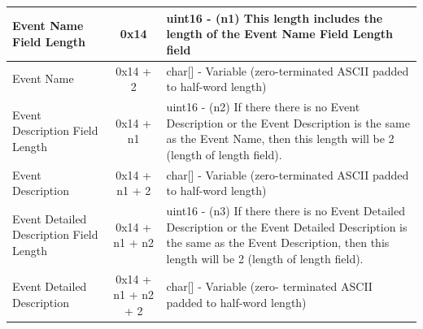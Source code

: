 \documentclass[14]{article}
\begin{document}
\begin{tabular}[l]{|p{5cm}|c|p{7cm}|}
  \hline
  Event Name Field Length & 0x14 & uint16 - (n1) This length includes the length
                                   of the Event Name Field Length field \\
  \hline
  Event Name & 0x14 + 2 & char[] - Variable (zero-terminated ASCII padded to
                          half-word length) \\
  \hline
  Event Description Field Length & 0x14 + n1 & uint16 - (n2) If there there is no
                                               Event Description or the Event
                                               Description is the same as the
                                               Event Name, then this length
                                               will be 2 (length of length
                                               field). \\
  \hline
  Event Description & 0x14 + n1 + 2 & char[] - Variable (zero-terminated ASCII
                                      padded to half-word length) \\
  \hline
  Event Detailed Description Field Length & 0x14 + n1 + n2 & uint16 - (n3) If
                                                             there there is no
                                                             Event Detailed
                                                             Description or the
                                                             Event Detailed
                                                             Description is the
                                                             same as the Event
                                                             Description, then
                                                             this length will be
                                                             2 (length of length
                                                             field). \\
  \hline
  Event Detailed Description & 0x14 + n1 + n2 + 2 & char[] - Variable (zero-
                                                    terminated ASCII padded to
                                                    half-word length) \\
  \hline
\end{tabular}
\end{document}
